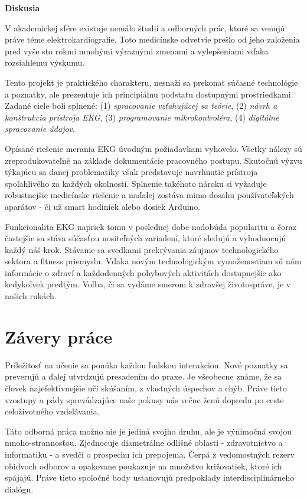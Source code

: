 \documentclass[titlepage,12pt]{article}
\begin{document}
\textbf{Diskusia}

V akademickej sfére existuje nemálo študií a odborných prác, ktoré sa venujú práve téme elektrokardiografie. Toto medicínske odvetvie prešlo od jeho založenia pred vyše sto rokmi mnohými výraznými zmenami a vylepšeniami vďaka rozsiahlemu výskumu.

Tento projekt je praktického charakteru, nesnaží sa prekonať súčasné technológie a poznatky, ale prezentuje ich principiálnu podstatu dostupnými prostriedkami.  Zadané ciele boli splnené: (1) \textit{spracovanie vzťahujúcej sa teórie}, (2) \textit{návrh a konštrukcia prístroja EKG}, (3) \textit{programovanie mikrokontroléra}, (4) \textit{digitálne spracovanie údajov}.

Opísané riešenie merania EKG úvodným požiadavkam vyhovelo. Všetky nálezy sú zreprodukovateľné na základe dokumentácie pracovného postupu. Skutočnú výzvu týkajúcu sa danej problematiky však predstavuje navrhnutie prístroja spoľahlivého za každých okolností. Splnenie takéhoto nároku si vyžaduje robustnejšie medicínske riešenie a naďalej zostáva mimo dosahu používateľských aparátov - či už smart hodiniek alebo dosiek Arduino.

Funkcionalita EKG napriek tomu v poslednej dobe nadobúda popularitu a čoraz častejšie sa stáva súčasťou nositeľných zariadení, ktoré sledujú a vyhodnocujú každý náš krok. Stávame sa svedkami prekrývania záujmov technologického sektora a fitness priemyslu. Vďaka novým technologickým vymoženostiam sú nám informácie o zdraví a každodenných pohybových aktivitách dostupnejšie ako kedykoľvek predtým. Voľba, či sa vydáme smerom k zdravšej životospráve, je v našich rukách.



\newpage
\section{Závery práce}
Príležitosť na učenie sa ponúka každou ľudskou interakciou. Nové poznatky sa preverujú a ďalej utvrdzujú presadením do praxe. Je všeobecne známe, že sa človek najefektívnejšie učí skúšaním, z vlastných úspechov a chýb. Práve tieto vzostupy a pády sprevádzajúce naše pokusy nás večne ženú dopredu po ceste celoživotného vzdelávania.

Táto odborná práca možno nie je jediná svojho druhu, ale je výnimočná svojou mnoho-strannosťou. Zjednocuje diametrálne odlišné oblasti - zdravotníctvo a informatiku - a svedčí o prospechu ich prepojenia. Čerpá z vedomostných rezerv obidvoch odborov a opakovane poukazuje na množstvo križovatiek, ktoré ich spájajú. Práve tieto spoločné body ustanovujú predpoklady interdisciplinárneho dialógu.
\end{document}
